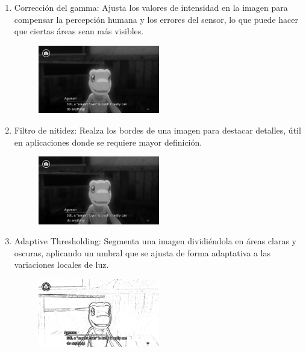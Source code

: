 \begin{enumerate}
	\item Corrección del gamma:
	Ajusta los valores de intensidad en la imagen para compensar la percepción humana y los errores del sensor, lo que puede hacer que ciertas áreas sean más visibles.
		\begin{figure}[H]
		\centering
		\includegraphics[width = 0.5\textwidth]{Imagenes/Preprocesado/4.png}
	\end{figure}
	
	\item Filtro de nitidez: 
	Realza los bordes de una imagen para destacar detalles, útil en aplicaciones donde se requiere mayor definición.
		\begin{figure}[H]
		\centering
		\includegraphics[width = 0.5\textwidth]{Imagenes/Preprocesado/5.png}
	\end{figure}
	
	\item Adaptive Thresholding:
	Segmenta una imagen dividiéndola en áreas claras y oscuras, aplicando un umbral que se ajusta de forma adaptativa a las variaciones locales de luz.
		\begin{figure}[H]
		\centering
		\includegraphics[width = 0.5\textwidth]{Imagenes/Preprocesado/6.png}
	\end{figure}
	

\end{enumerate}
